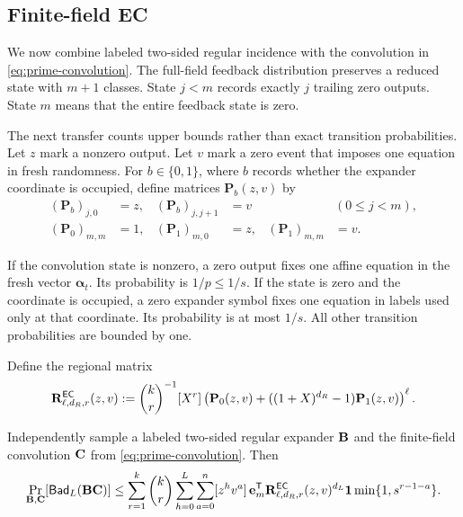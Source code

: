 \subsection{Finite-field EC}

We now combine labeled two-sided regular incidence with the convolution in
\eqref{eq:prime-convolution}.  The full-field feedback distribution preserves
a reduced state with $m+1$ classes.  State $j<m$ records exactly $j$ trailing
zero outputs.  State $m$ means that the entire feedback state is zero.

The next transfer counts upper bounds rather than exact transition
probabilities.  Let $z$ mark a nonzero output.  Let $v$ mark a zero event that
imposes one equation in fresh randomness.  For $b\in\{0,1\}$, where $b$
records whether the expander coordinate is occupied, define matrices
$\mathbf P_b(z,v)$ by
\begin{align}
 (\mathbf P_b)_{j,0}&=z,&
 (\mathbf P_b)_{j,j+1}&=v
 &&(0\leq j<m),
 \label{eq:p-ec-active-trace}\\
 (\mathbf P_0)_{m,m}&=1,&
 (\mathbf P_1)_{m,0}&=z,&
 (\mathbf P_1)_{m,m}&=v.
 \label{eq:p-ec-zero-trace}
\end{align}

If the convolution state is nonzero, a zero output fixes one affine equation
in the fresh vector $\boldsymbol\alpha_t$.  Its probability is $1/p\leq1/s$.
If the state is zero and the coordinate is occupied, a zero expander symbol
fixes one equation in labels used only at that coordinate.  Its probability
is at most $1/s$.  All other transition probabilities are bounded by one.

Define the regional matrix
\begin{equation}
 \mathbf R^{\mathsf{EC}}_{\ell,d_R,r}(z,v):=
 \binom{k}{r}^{-1}[X^r]
 \left(\mathbf P_0(z,v)+
 ((1+X)^{d_R}-1)\mathbf P_1(z,v)\right)^\ell.
 \label{eq:p-ec-biregular-region}
\end{equation}

\begin{theorem}
\label{thm:p-ec-trace}
Independently sample a labeled two-sided regular expander $\mathbf B$ and the
finite-field convolution $\mathbf C$ from \eqref{eq:prime-convolution}.  Then
\begin{equation}
 \Pr_{\mathbf B,\mathbf C}[\mathsf{Bad}_L(\mathbf B\mathbf C)]\leq
 \sum_{r=1}^{k}\binom{k}{r}
 \sum_{h=0}^{L}\sum_{a=0}^{n}[z^hv^a]\,
 \mathbf e_m^{\mathsf T}
 \mathbf R^{\mathsf{EC}}_{\ell,d_R,r}(z,v)^{d_L}\mathbf 1
 \min\{1,s^{r-1-a}\}.
 \label{eq:p-ec-trace}
\end{equation}
\end{theorem}

